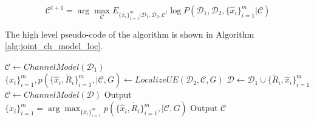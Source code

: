 \documentclass[conference, 10pt]{IEEEtran}
\begin{document}
\begin{equation}
\mathcal{C}^{t+1} = \arg \max_{\mathcal{C}} E_{\{\hat{x}_i\}_{i=1}^m |\mathcal{D}_1,\mathcal{D}_2,\mathcal{C}^t} \log  P(\mathcal{D}_1,\mathcal{D}_2,\{\hat{x}_i\}_{i=1}^m|\mathcal{C}) \label{eq:EM}
\end{equation}

The high level pseudo-code of the algorithm is shown in Algorithm \ref{alg:joint_ch_model_loc}.  


\begin{algorithm}
\caption{$JCML(\mathcal{D}_1, \mathcal{D}_2, G, N_{em})$}
\label{alg:joint_ch_model_loc}
\begin{algorithmic}[1]
\State $\mathcal{C} \gets ChannelModel(\mathcal{D}_1)$
	\State $\{\hat{x}_i\}_{i=1}^m, p(\{\hat{x}_i,\tilde{R}_i\}_{i=1}^m,|\mathcal{C},G) \gets LocalizeUE(\mathcal{D}_2,\mathcal{C},G)$ \label{step:localize}
	\State $\mathcal{D} \gets \mathcal{D}_1 \cup \{\tilde{R}_i,\hat{x}_i\}_{i=1}^m$ \label{line:em_approx}
	\State $\mathcal{C} \gets ChannelModel(\mathcal{D})$
\EndFor
\State Output $\{\hat{x}_i\}_{i=1}^m = \arg \max_{\{\hat{x}_i\}_{i=1}^m} p(\{\hat{x}_i,\tilde{R}_i\}_{i=1}^m,|\mathcal{C},G)$
\State Output $\mathcal{C}$
\end{algorithmic}
\end{algorithm}  
\end{document}
